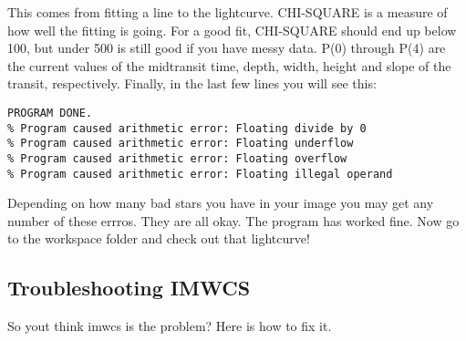 \documentclass[10pt,preprint]{aastex}
\begin{document}
This comes from fitting a line to the lightcurve. CHI-SQUARE is a measure of how well the fitting is going. For a good fit, CHI-SQUARE should end up below 100, but under 500 is still good if you have messy data. P(0) through P(4) are the current values of the midtransit time, depth, width, height and slope of the transit, respectively.  Finally, in the last few lines you will see this:

\begin{verbatim}
PROGRAM DONE.
% Program caused arithmetic error: Floating divide by 0
% Program caused arithmetic error: Floating underflow
% Program caused arithmetic error: Floating overflow
% Program caused arithmetic error: Floating illegal operand
\end{verbatim}

Depending on how many bad stars you have in your image you may get any number of these errros. They are all okay. The program has worked fine. 
Now go to the workspace folder and check out that lightcurve!

\subsection{Troubleshooting IMWCS}
So yout think imwcs is the problem? Here is how to fix it.
\end{document}

